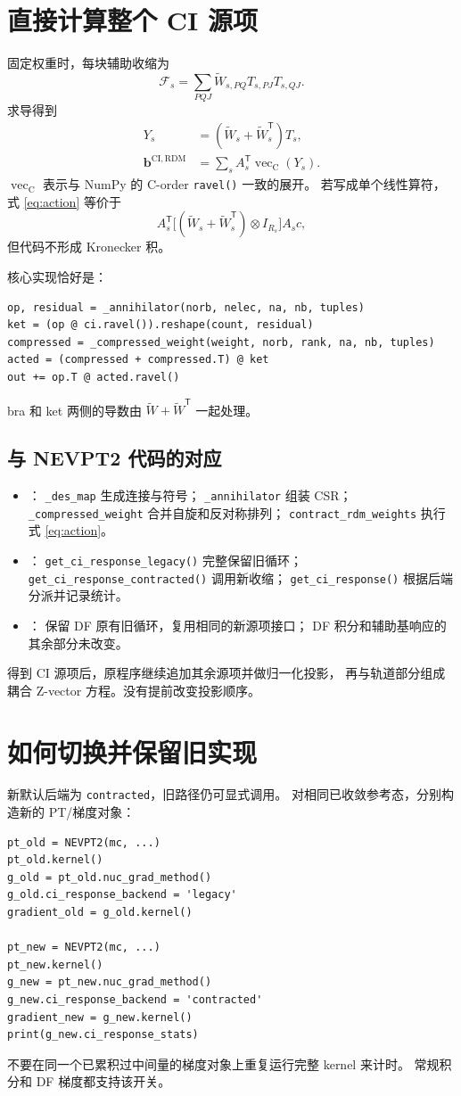 \documentclass[UTF8,a4paper,11pt,fontset=fandol]{ctexart}
\newcommand{\CI}{\mathrm{CI}}
\newcommand{\T}{\mathsf{T}}
\newcommand{\vrow}{\operatorname{vec}_{\mathrm C}}
\begin{document}
\section{直接计算整个 CI 源项}
固定权重时，每块辅助收缩为
\[
 \mathcal F_s
 =\sum_{PQJ}\widetilde W_{s,PQ}T_{s,PJ}T_{s,QJ}.
\]
求导得到
\begin{align}
 Y_s&=(\widetilde W_s+\widetilde W_s^\T)T_s,\\
 \bm b^{\CI,\mathrm{RDM}}
 &=\sum_s A_s^\T\vrow(Y_s).
 \label{eq:action}
\end{align}
$\vrow$ 表示与 NumPy 的 C-order \texttt{ravel()} 一致的展开。
若写成单个线性算符，式 \eqref{eq:action} 等价于
\[
 A_s^\T\big[(\widetilde W_s+\widetilde W_s^\T)
                  \otimes I_{R_s}\big]A_s c,
\]
但代码不形成 Kronecker 积。

核心实现恰好是：
\begin{lstlisting}
op, residual = _annihilator(norb, nelec, na, nb, tuples)
ket = (op @ ci.ravel()).reshape(count, residual)
compressed = _compressed_weight(weight, norb, rank, na, nb, tuples)
acted = (compressed + compressed.T) @ ket
out += op.T @ acted.ravel()
\end{lstlisting}
bra 和 ket 两侧的导数由 $\widetilde W+\widetilde W^\T$ 一起处理。

\subsection{与 NEVPT2 代码的对应}
\begin{itemize}
 \item {}：
 \texttt{\_des\_map} 生成连接与符号；
 \texttt{\_annihilator} 组装 CSR；
 \texttt{\_compressed\_weight} 合并自旋和反对称排列；
 \texttt{contract\_rdm\_weights} 执行式 \eqref{eq:action}。
 \item {}：
 \texttt{get\_ci\_response\_legacy()} 完整保留旧循环；
 \texttt{get\_ci\_response\_contracted()} 调用新收缩；
 \texttt{get\_ci\_response()} 根据后端分派并记录统计。
 \item {}：
 保留 DF 原有旧循环，复用相同的新源项接口；
 DF 积分和辅助基响应的其余部分未改变。
\end{itemize}
得到 CI 源项后，原程序继续追加其余源项并做归一化投影，
再与轨道部分组成耦合 Z-vector 方程。没有提前改变投影顺序。

\section{如何切换并保留旧实现}
新默认后端为 \texttt{contracted}，旧路径仍可显式调用。
对相同已收敛参考态，分别构造新的 PT/梯度对象：
\begin{lstlisting}
pt_old = NEVPT2(mc, ...)
pt_old.kernel()
g_old = pt_old.nuc_grad_method()
g_old.ci_response_backend = 'legacy'
gradient_old = g_old.kernel()

pt_new = NEVPT2(mc, ...)
pt_new.kernel()
g_new = pt_new.nuc_grad_method()
g_new.ci_response_backend = 'contracted'
gradient_new = g_new.kernel()
print(g_new.ci_response_stats)
\end{lstlisting}
不要在同一个已累积过中间量的梯度对象上重复运行完整 kernel 来计时。
常规积分和 DF 梯度都支持该开关。
\end{document}
